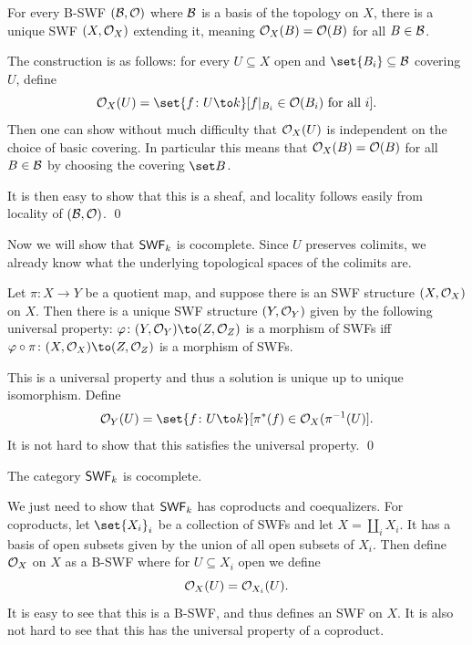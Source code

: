 \edefn

\bprop

    For every B-SWF $({\cal B},{{\cal O}})$ where ${\cal B}$ is a basis of the topology on $X$, there is a unique SWF $(X,{{\cal O}}_X)$ extending it, meaning ${{\cal O}}_X(B)={{\cal O}}(B)$ for all $B\in{\cal B}$.

\eprop

\bproof

    The construction is as follows: for every $U\subseteq X$ open and $\set{B_i}\subseteq\c B$ covering $U$, define
    $$ \O_X(U) = \set{f\colon U\to k}[f|_{B_i}\in\O(B_i)\hbox{ for all $i$}] . $$
    Then one can show without much difficulty that ${{\cal O}}_X(U)$ is independent on the choice of basic covering.
    In particular this means that ${{\cal O}}_X(B)={{\cal O}}(B)$ for all $B\in{\cal B}$ by choosing the covering $\set B$.

    It is then easy to show that this is a sheaf, and locality follows easily from locality of $({\cal B},{{\cal O}})$.
    \qed

\eproof

Now we will show that ${\sf SWF}_k$ is cocomplete.
Since $U$ preserves colimits, we already know what the underlying topological spaces of the colimits are.

\blemm

    Let $\pi\colon X\to Y$ be a quotient map, and suppose there is an SWF structure $(X,{{\cal O}}_X)$ on $X$.
    Then there is a unique SWF structure $(Y,{{\cal O}}_Y)$ given by the following universal property: $\phi\colon(Y,\O_Y)\to(Z,\O_Z)$ is a morphism of SWFs iff $\phi\circ\pi\colon(X,\O_X)\to(Z,\O_Z)$
    is a morphism of SWFs.

\elemm

\bproof

    This is a universal property and thus a solution is unique up to unique isomorphism.
    Define
    $$ \O_Y(U) = \set{f\colon U\to k}[\pi^*(f)\in\O_X(\pi^{-1}(U)] . $$
    It is not hard to show that this satisfies the universal property.
    \qed


\eproof

\bthrm

    The category ${\sf SWF}_k$ is cocomplete.

\ethrm

\bproof

    We just need to show that ${\sf SWF}_k$ has coproducts and coequalizers.
    For coproducts, let $\set{X_i}_i$ be a collection of SWFs and let $X=\coprod_iX_i$.
    It has a basis of open subsets given by the union of all open subsets of $X_i$.
    Then define ${{\cal O}}_X$ on $X$ as a B-SWF where for $U\subseteq X_i$ open we define
    $$ {{\cal O}}_X(U) = {{\cal O}}_{X_i}(U) . $$
    It is easy to see that this is a B-SWF, and thus defines an SWF on $X$.
    It is also not hard to see that this has the universal property of a coproduct.

